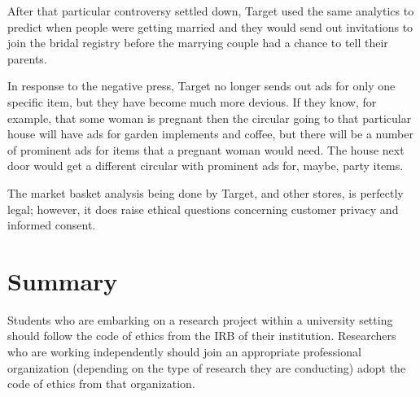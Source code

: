 After that particular controversy settled down, Target used the same analytics to predict when people were getting married and they would send out invitations to join the bridal registry before the marrying couple had a chance to tell their parents.

In response to the negative press, Target no longer sends out ads for only one specific item, but they have become much more devious. If they know, for example, that some woman is pregnant then the circular going to that particular house will have ads for garden implements and coffee, but there will be a number of prominent ads for items that a pregnant woman would need. The house next door would get a different circular with prominent ads for, maybe, party items.

The market basket analysis being done by Target, and other stores, is perfectly legal; however, it does raise ethical questions concerning customer privacy and informed consent. 

\section{Summary}

Students who are embarking on a research project within a university setting should follow  the code of ethics from the \ac{IRB} of their institution. Researchers who are working independently should join an appropriate professional organization (depending on the type of research they are conducting) adopt the code of ethics from that organization.

